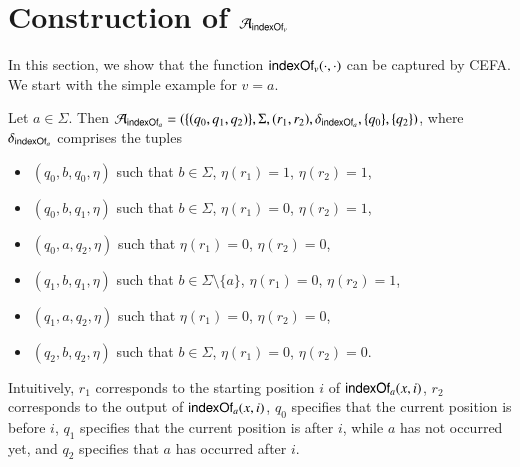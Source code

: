 
\section{Construction of $\mathcal{A}_{\mathsf{indexOf}_v}$} \label{appendix:cefa_indexof}

In this section, we show that the function $\mathsf{indexOf}_v(\cdot, \cdot)$ can be captured by CEFA. 
%
We start with the simple example for $v=a$.
\begin{example} %
	Let $a \in \Sigma$. Then  $\mathcal{A}_{\mathsf{indexOf}_a} = (\{(q_0, q_1, q_2)\}, \Sigma, (r_1,r_2), \delta_{\mathsf{indexOf}_a}, \{q_0\}, \{q_2\})$, where $\delta_{\mathsf{indexOf}_a}$ comprises the tuples
	\begin{itemize}
		\item $(q_0, b, q_0, \eta)$ such that $b \in \Sigma$, $\eta(r_1)=1$, $\eta(r_2)=1$,
		\item $(q_0, b, q_1, \eta)$ such that $b \in \Sigma$, $\eta(r_1)=0$, $\eta(r_2) = 1$,
		\item $(q_0, a, q_2, \eta)$ such that $\eta(r_1)=0$, $\eta(r_2) = 0$,
		\item $(q_1, b, q_1, \eta)$ such that $b \in \Sigma \setminus \{a\}$, $\eta(r_1)=0$, $\eta(r_2)=1$,
		\item $(q_1, a, q_2, \eta)$ such that $\eta(r_1)=0$, $\eta(r_2)=0$,
		\item $(q_2, b, q_2, \eta)$ such that $b \in \Sigma$, $\eta(r_1)=0$, $\eta(r_2)=0$.
	\end{itemize}
	Intuitively, $r_1$ corresponds to the starting position $i$ of $\mathsf{indexOf}_a(x, i)$, $r_2$ corresponds to the output of $\mathsf{indexOf}_a(x, i)$, $q_0$ specifies that the current position is before $i$, $q_1$ specifies that the current position is after $i$, while $a$ has not occurred yet, and $q_2$ specifies that $a$ has occurred after $i$. 
\end{example}

